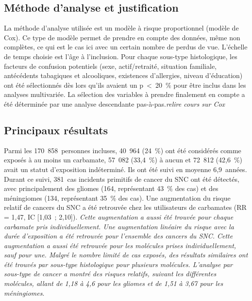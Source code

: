 \documentclass[10pt]{article}
\begin{document}
\subsection{Méthode d'analyse et justification}
La méthode d'analyse utilisée est un modèle à risque proportionnel (modèle de Cox). Ce type de modèle permet de prendre en compte des données, même non complètes, ce qui est le cas ici avec un certain nombre de perdus de vue. L'échelle de temps choisie est l'âge à l'inclusion. Pour chaque sous-type histologique, les facteurs de confusion potentiels (sexe, actif/retraité, situation familiale, antécédents tabagiques et alcooliques, existences d'allergies, niveau d'éducation) ont été sélectionnés dès lors qu'ils avaient un p~<~20~\% pour être inclus dans les analyses multivariée. La sélection des variables à prendre finalement en compte a été déterminée par une analyse descendante pas-à-pas.\emph{relire cours sur Cox}

\subsection{Principaux résultats}
Parmi les 170~858~personnes incluses, 40~964 (24~\%) ont été considérés comme exposés à au moins un carbamate, 57~082 (33,4~\%) à aucun et 72~812 (42,6~\%) avait un statut d'exposition indéterminé. Ils ont été suivi en moyenne 6,9~années. Durant ce suivi, 381~cas incidents primitifs de cancer du SNC ont été détectés, avec principalement des gliomes (164, représentant 43~\% des cas) et des méningiomes (134, représentant 35~\% des cas). Une augmentation du risque relatif de cancers du SNC a été retrouvée chez les utilisateurs de carbamates (RR = 1,47, IC [1,03~; 2,10]). \emph{Cette augmentation a aussi été trouvée pour chaque carbamate pris individuellement. Une augmentation linéaire du risque avec la durée d'exposition a été retrouvée pour l'ensemble des cancers du SNC. Cette augmentation a aussi été retrouvée pour les molécules prises individuellement, sauf pour une. Malgré le nombre limité de cas exposés, des résultats similaires ont été trouvés par sous-type histologique pour plusieurs molécules. L'analyse par sous-type de cancer a montré des risques relatifs, suivant les différentes molécules, allant de 1,18 à 4,6 pour les gliomes et de 1,51 à 3,67 pour les méningiomes}.
\end{document}
